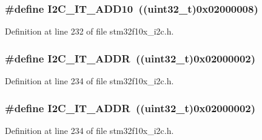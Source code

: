 \subsubsection[{\texorpdfstring{I2\+C\+\_\+\+I\+T\+\_\+\+A\+D\+D10}{I2C_IT_ADD10}}]{\setlength{\rightskip}{0pt plus 5cm}\#define I2\+C\+\_\+\+I\+T\+\_\+\+A\+D\+D10~(({\bf uint32\+\_\+t})0x02000008)}\hypertarget{group___i2_c__interrupts__definition_ga8a9bc5a1dee3bbd41347b19cf117c0f3}{}\label{group___i2_c__interrupts__definition_ga8a9bc5a1dee3bbd41347b19cf117c0f3}


Definition at line 232 of file stm32f10x\+\_\+i2c.\+h.

\subsubsection[{\texorpdfstring{I2\+C\+\_\+\+I\+T\+\_\+\+A\+D\+DR}{I2C_IT_ADDR}}]{\setlength{\rightskip}{0pt plus 5cm}\#define I2\+C\+\_\+\+I\+T\+\_\+\+A\+D\+DR~(({\bf uint32\+\_\+t})0x02000002)}\hypertarget{group___i2_c__interrupts__definition_gaf68f1eda33dcb13626597f477d044025}{}\label{group___i2_c__interrupts__definition_gaf68f1eda33dcb13626597f477d044025}


Definition at line 234 of file stm32f10x\+\_\+i2c.\+h.

\subsubsection[{\texorpdfstring{I2\+C\+\_\+\+I\+T\+\_\+\+A\+D\+DR}{I2C_IT_ADDR}}]{\setlength{\rightskip}{0pt plus 5cm}\#define I2\+C\+\_\+\+I\+T\+\_\+\+A\+D\+DR~(({\bf uint32\+\_\+t})0x02000002)}\hypertarget{group___i2_c__interrupts__definition_gaf68f1eda33dcb13626597f477d044025}{}\label{group___i2_c__interrupts__definition_gaf68f1eda33dcb13626597f477d044025}


Definition at line 234 of file stm32f10x\+\_\+i2c.\+h.

